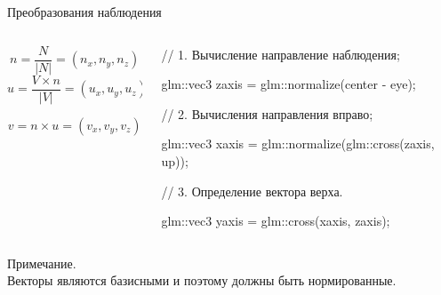 \documentclass{beamer}
\begin{document}
	\begin{frame}{Преобразования наблюдения}

		\begin{columns}
			\begin{column}{0.4\textwidth}
				\[
					n = \frac{N}{|N|}	= (n_x, n_y, n_z)
				\]
				\[
					u = \frac{V \times n }{|V|} = (u_x,u_y,u_z)	
				\]
		
				\[
					v = n \times u = (v_x, v_y, v_z)	
				\]
		
			\end{column}
			\begin{column}{0.6\textwidth}
				// 1. Вычисление направление наблюдения;

				glm::vec3 zaxis = glm::normalize(center - eye);
				
				// 2. Вычисления направления вправо;
				
				glm::vec3 xaxis = glm::normalize(glm::cross(zaxis, up));
				
				// 3. Определение вектора верха.
				
				glm::vec3 yaxis = glm::cross(xaxis, zaxis);
			\end{column}
		\end{columns}

		\vspace{0.5cm}
		Примечание. \\
		Векторы являются базисными и поэтому должны быть нормированные.
		
	\end{frame}
\end{document}
